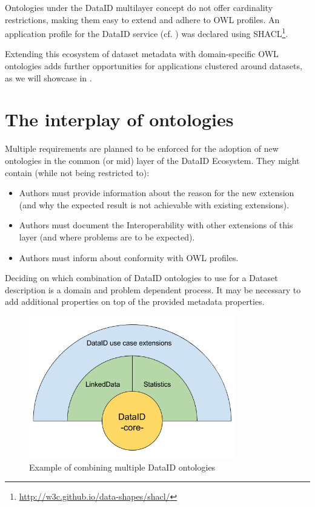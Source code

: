 \documentclass[a4paper,english,twoside,BCOR1.5cm,headsepline,DIV12,appendixprefix,final,12pt]{scrbook}
\newcommand\footnoteurl[1]{\footnote{\scriptsize\url{#1}}}
\begin{document}
Ontologies under the DataID multilayer concept do not offer cardinality restrictions, making them easy to extend and adhere to OWL profiles. An application profile for the DataID service (cf. ) was declared using SHACL\footnoteurl{http://w3c.github.io/data-shapes/shacl/}.%

Extending this ecosystem of dataset metadata with domain-specific OWL ontologies adds further opportunities for applications clustered around datasets, as we will showcase in .


\section{The interplay of ontologies} 
\label{sec:interplay}
Multiple requirements are planned to be enforced for the adoption of new ontologies in the common (or mid) layer of the DataID Ecosystem.
They might contain (while not being restricted to):

\begin{itemize}
\item Authors must provide information about the reason for the new extension (and why the expected result is not achievable with existing extensions).
\item Authors must document the Interoperability with other extensions of this layer (and where problems are to be expected).
\item Authors must inform about conformity with OWL profiles.
\end{itemize}

Deciding on which combination of DataID ontologies to use for a Dataset description is a domain and problem dependent process. It may be necessary to add additional properties on top of the provided metadata properties.

\begin{figure}[!htbp]
\centering
  \includegraphics[width=9cm]{images/DataIDonionSliced.png}
  \caption{Example of combining multiple DataID ontologies}
  \label{fig:onionslice}
\end{figure}
\end{document}
